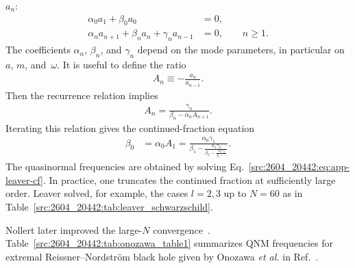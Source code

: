 $a_n$:
\begin{align}
 \alpha_0 a_1 + \beta_0 a_0 &= 0,
 \\
 \alpha_n a_{n+1} + \beta_n a_n + \gamma_n a_{n-1} &= 0,
 \qquad n \ge 1.
\end{align}
The coefficients $\alpha_n$, $\beta_n$, and $\gamma_n$ depend on the mode parameters,
in particular on $a$, $m$, and~$\omega$.
It is useful to define the ratio
\begin{align}
 A_n \equiv - \frac{a_n}{a_{n-1}} .
\end{align}
Then the recurrence relation implies
\begin{align}
 A_n = \frac{\gamma_n}{\beta_n - \alpha_n A_{n+1}} .
\end{align}
Iterating this relation gives the continued-fraction equation
\begin{align}
 \beta_0 &= \alpha_0 A_1
 = \frac{\alpha_0 \gamma_1}{
 \beta_1 - \frac{\alpha_1 \gamma_2}{
 \beta_2 - \frac{\alpha_2 \gamma_3}{
 \beta_3 - \cdots
 }}}.
 \label{src:2604_20442:eq:app-leaver-cf}
\end{align}
The quasinormal frequencies are obtained by solving Eq.~\eqref{src:2604_20442:eq:app-leaver-cf}.
In practice, one truncates the continued fraction at sufficiently large order.
Leaver solved, for example, the cases $l=2,3$ up to $N=60$ as in Table~\ref{src:2604_20442:tab:leaver_schwarzschild}.

Nollert later improved the large-$N$ convergence~\cite{Nollert:1993zz}.
Table~\ref{src:2604_20442:tab:onozawa_table1} summarizes QNM frequencies for extremal Reissner--Nordstr\"om black hole given by Onozawa \textit{et al.\/} in Ref.~\cite{Onozawa:1995vu}.
